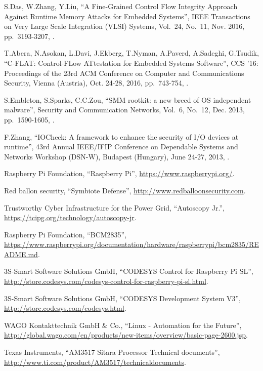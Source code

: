 \begin{thebibliography}{99}
S.Das, W.Zhang, Y.Liu,
``A Fine-Grained Control Flow Integrity Approach Against Runtime Memory Attacks for Embedded Systems'',
IEEE Transactions on Very Large Scale Integration (VLSI) Systems,
Vol.\ 24, No.\ 11,
Nov. 2016,
pp.\ 3193-3207,
.

T.Abera, N.Asokan, L.Davi, J.Ekberg, T.Nyman, A.Paverd, A.Sadeghi, G.Tsudik,
``C-FLAT: Control-FLow ATtestation for Embedded Systems Software'',
CCS '16: Proceedings of the 23rd ACM Conference on Computer and Communications Security,
Vienna (Austria), Oct. 24-28, 2016,
pp.\ 743-754,
.

S.Embleton, S.Sparks, C.C.Zou,
``SMM rootkit: a new breed of OS independent malware'',
Security and Communication Networks,
Vol.\ 6, No.\ 12,
Dec. 2013,
pp.\ 1590-1605,
.

F.Zhang,
``IOCheck: A framework to enhance the security of I/O devices at runtime'',
43rd Annual IEEE/IFIP Conference on Dependable Systems and Networks Workshop (DSN-W),
Budapest (Hungary), June 24-27, 2013,
.

Raspberry Pi Foundation,
``Raspberry Pi'',
\url{https://www.raspberrypi.org/}.

Red ballon security,
``Symbiote Defense'',
\url{http://www.redballoonsecurity.com}.

Trustworthy Cyber Infrastructure for the Power Grid,
``Autoscopy Jr.'',
\url{https://tcipg.org/technology/autoscopy-jr}.

Raspberry Pi Foundation,
``BCM2835'',
\url{https://www.raspberrypi.org/documentation/hardware/raspberrypi/bcm2835/README.md}.

3S-Smart Software Solutions GmbH,
``CODESYS Control for Raspberry Pi SL'',
\url{http://store.codesys.com/codesys-control-for-raspberry-pi-sl.html}.

3S-Smart Software Solutions GmbH,
``CODESYS Development System V3'',
\url{http://store.codesys.com/codesys.html}.

WAGO Kontakttechnik GmbH \& Co.,
``Linux - Automation for the Future'',
\url{http://global.wago.com/en/products/new-items/overview/basic-page-2600.jsp}.

Texas Instruments,
``AM3517 Sitara Processor Technical documents'',
\url{http://www.ti.com/product/AM3517/technicaldocuments}.


\end{thebibliography}
